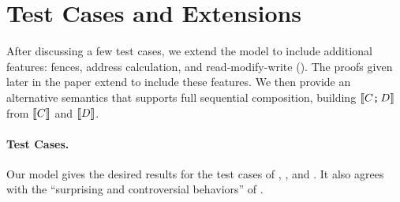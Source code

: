 \section{Test Cases and Extensions}
\label{sec:variants}

After discussing a few test cases, we extend the model to include additional
features: fences, address calculation, and read-modify-write (\RMW). The
proofs given later in the paper extend to include these features.  We then
provide an alternative semantics that supports full sequential composition,
building $\llbracket C\texttt{;}\,\allowbreak D\rrbracket$ from $\llbracket C\rrbracket$ and $\llbracket D\rrbracket$.

\paragraph{Test Cases.}
Our model gives the desired results for the test cases of \citet{PughWebsite},
\citet[]{SevcikThesis}, and \citet[]{DBLP:conf/esop/BattyMNPS15}.  It also agrees with the ``surprising and
controversial behaviors'' of \citet[]{Manson:2005:JMM:1047659.1040336}.

